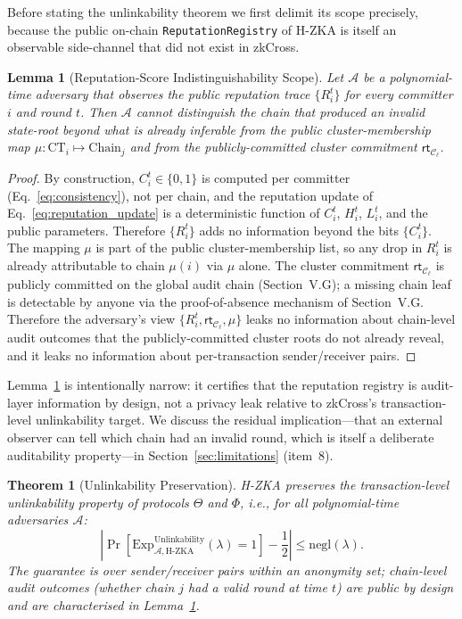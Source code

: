 \documentclass[journal]{IEEEtran}
\newtheorem{theorem}{Theorem}
\newtheorem{lemma}{Lemma}
\begin{document}
Before stating the unlinkability theorem we first delimit its scope precisely, because the public on-chain \texttt{ReputationRegistry} of H-ZKA is itself an observable side-channel that did not exist in zkCross.

\begin{lemma}[Reputation-Score Indistinguishability Scope]
\label{lem:rep-scope}
Let $\mathcal{A}$ be a polynomial-time adversary that observes the public reputation trace $\{R_i^{t}\}$ for every committer $i$ and round $t$. Then $\mathcal{A}$ cannot distinguish the chain that produced an invalid state-root {beyond} what is already inferable from the public cluster-membership map $\mu : \text{CT}_i \mapsto \text{Chain}_j$ and from the publicly-committed cluster commitment $\mathsf{rt}_{\mathcal{C}_\ell}$.
\end{lemma}
\begin{proof}
By construction, $C_i^{t}\in\{0,1\}$ is computed per committer (Eq.~\ref{eq:consistency}), not per chain, and the reputation update of Eq.~\ref{eq:reputation_update} is a deterministic function of $C_i^{t}$, $H_i^{t}$, $L_i^{t}$, and the public parameters. Therefore $\{R_i^{t}\}$ adds no information beyond the bits $\{C_i^{t}\}$. The mapping $\mu$ is part of the public cluster-membership list, so any drop in $R_i^{t}$ is already attributable to chain $\mu(i)$ via $\mu$ alone. The cluster commitment $\mathsf{rt}_{\mathcal{C}_\ell}$ is publicly committed on the global audit chain (Section~V.G); a missing chain leaf is detectable by anyone via the proof-of-absence mechanism of Section~V.G. Therefore the adversary's view $\{R_i^{t}, \mathsf{rt}_{\mathcal{C}_\ell}, \mu\}$ leaks no information about chain-level audit outcomes that the publicly-committed cluster roots do not already reveal, and it leaks no information about per-transaction sender/receiver pairs.
\end{proof}

Lemma~\ref{lem:rep-scope} is intentionally narrow: it certifies that the reputation registry is {audit-layer} information by design, not a privacy leak relative to zkCross's transaction-level unlinkability target. We discuss the residual implication---that an external observer can tell which chain had an invalid round, which is itself a deliberate auditability property---in Section~\ref{sec:limitations} (item~8).

\begin{theorem}[Unlinkability Preservation]
\label{thm:unlinkability}
H-ZKA preserves the {transaction-level} unlinkability property of protocols $\Theta$ and $\Phi$, i.e., for all polynomial-time adversaries $\mathcal{A}$:
\begin{equation}
\left|\Pr\left[\text{Exp}^{\text{Unlinkability}}_{\mathcal{A}, \text{H-ZKA}}(\lambda) = 1\right] - \frac{1}{2}\right| \leq \text{negl}(\lambda).
\end{equation}
The guarantee is over sender/receiver pairs within an anonymity set; chain-level audit outcomes (whether chain $j$ had a valid round at time $t$) are public by design and are characterised in Lemma~\ref{lem:rep-scope}.
\end{theorem}
\end{document}

